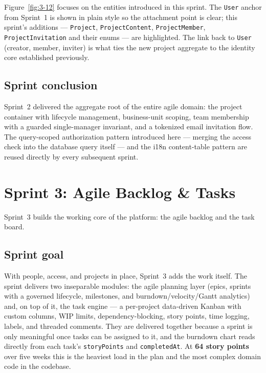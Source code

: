 Figure~\ref{fig:3-12} focuses on the entities introduced in this sprint. The \texttt{User} anchor
from Sprint~1 is shown in plain style so the attachment point is clear; this sprint's additions ---
\texttt{Project}, \texttt{ProjectContent}, \texttt{ProjectMember}, \texttt{ProjectInvitation} and
their enums --- are highlighted. The link back to \texttt{User} (creator, member, inviter) is
what ties the new project aggregate to the identity core established previously.

{\renewcommand{\figmaxheight}{0.82\textheight}%
}

\subsection{Sprint conclusion}

Sprint~2 delivered the aggregate root of the entire agile domain: the project container with
lifecycle management, business-unit scoping, team membership with a guarded single-manager
invariant, and a tokenized email invitation flow. The query-scoped authorization pattern
introduced here --- merging the access check into the database query itself --- and the i18n
content-table pattern are reused directly by every subsequent sprint.

\clearpage
\section{Sprint 3: Agile Backlog \& Tasks}

Sprint~3 builds the working core of the platform: the agile backlog and the task board.

\subsection{Sprint goal}

With people, access, and projects in place, Sprint~3 adds the work itself. The sprint delivers
two inseparable modules: the agile planning layer (epics, sprints with a governed lifecycle,
milestones, and burndown/velocity/Gantt analytics) and, on top of it, the task engine --- a
per-project data-driven Kanban with custom columns, WIP limits, dependency-blocking, story
points, time logging, labels, and threaded comments. They are delivered together because a
sprint is only meaningful once tasks can be assigned to it, and the burndown chart reads
directly from each task's \texttt{storyPoints} and \texttt{completedAt}. At \textbf{64 story
points} over five weeks this is the heaviest load in the plan and the most complex domain code
in the codebase.

